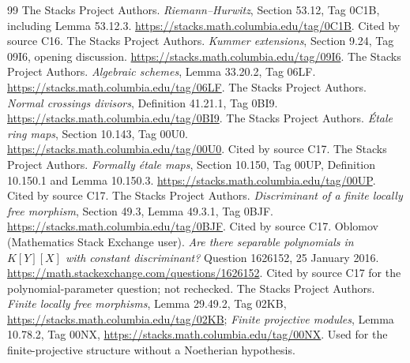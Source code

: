 \documentclass[11pt,oneside]{article}
\numberwithin{equation}{section}
\theoremstyle{definition}
\theoremstyle{remark}
\begin{document}
\begin{thebibliography}{99}
The Stacks Project Authors.
\emph{Riemann--Hurwitz}, Section 53.12, Tag 0C1B, including Lemma 53.12.3.
\url{https://stacks.math.columbia.edu/tag/0C1B}. Cited by source C16.
The Stacks Project Authors.
\emph{Kummer extensions}, Section 9.24, Tag 09I6, opening discussion.
\url{https://stacks.math.columbia.edu/tag/09I6}.
The Stacks Project Authors.
\emph{Algebraic schemes}, Lemma 33.20.2, Tag 06LF.
\url{https://stacks.math.columbia.edu/tag/06LF}.
The Stacks Project Authors.
\emph{Normal crossings divisors}, Definition 41.21.1, Tag 0BI9.
\url{https://stacks.math.columbia.edu/tag/0BI9}.
The Stacks Project Authors.
\emph{\'Etale ring maps}, Section 10.143, Tag 00U0.
\url{https://stacks.math.columbia.edu/tag/00U0}. Cited by source C17.
The Stacks Project Authors.
\emph{Formally \'etale maps}, Section 10.150, Tag 00UP, Definition 10.150.1 and
Lemma 10.150.3. \url{https://stacks.math.columbia.edu/tag/00UP}. Cited by source C17.
The Stacks Project Authors.
\emph{Discriminant of a finite locally free morphism}, Section 49.3, Lemma 49.3.1, Tag 0BJF.
\url{https://stacks.math.columbia.edu/tag/0BJF}. Cited by source C17.
Oblomov (Mathematics Stack Exchange user).
\emph{Are there separable polynomials in $K[Y][X]$ with constant discriminant?}
Question 1626152, 25 January 2016. \url{https://math.stackexchange.com/questions/1626152}.
Cited by source C17 for the polynomial-parameter question; not rechecked.
The Stacks Project Authors.
\emph{Finite locally free morphisms}, Lemma 29.49.2, Tag 02KB,
\url{https://stacks.math.columbia.edu/tag/02KB};
\emph{Finite projective modules}, Lemma 10.78.2, Tag 00NX,
\url{https://stacks.math.columbia.edu/tag/00NX}.
Used for the finite-projective structure without a Noetherian hypothesis.
\end{thebibliography}
\end{document}
